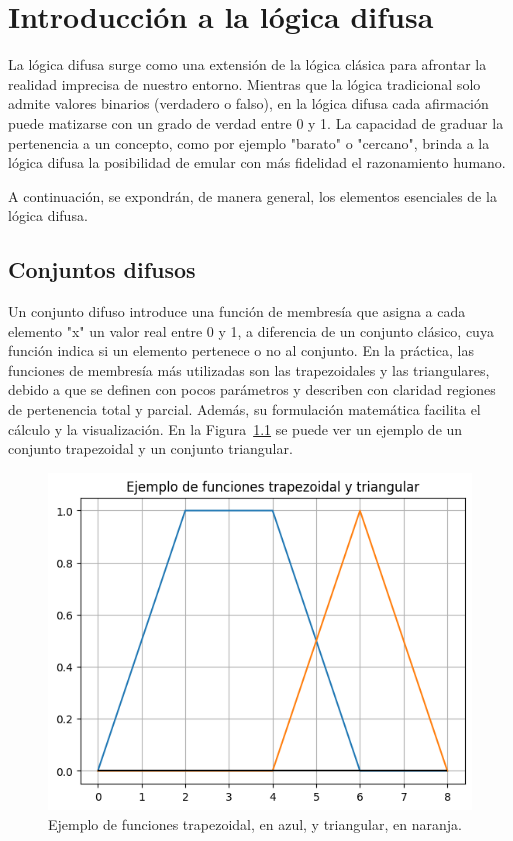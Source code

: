 \chapter{Introducción a la lógica difusa}
\label{ch:fuzzyApendix}

La lógica difusa surge como una extensión de la lógica clásica para afrontar la realidad imprecisa de nuestro entorno. Mientras que la lógica tradicional solo admite valores binarios (verdadero o falso), en la lógica difusa cada afirmación puede matizarse con un grado de verdad entre 0 y 1. La capacidad de graduar la pertenencia a un concepto, como por ejemplo "barato" o "cercano", brinda a la lógica difusa la posibilidad de emular con más fidelidad el razonamiento humano. 

A continuación, se expondrán, de manera general, los elementos esenciales de la lógica difusa.

\section{Conjuntos difusos}
\label{apx:ConjuntosDifusos}

Un conjunto difuso introduce una función de membresía que asigna a cada elemento "x" un valor real entre 0 y 1, a diferencia de un conjunto clásico, cuya función indica si un elemento pertenece o no al conjunto. En la práctica, las funciones de membresía más utilizadas son las trapezoidales y las triangulares, debido a que se definen con pocos parámetros y describen con claridad regiones de pertenencia total y parcial. Además, su formulación matemática facilita el cálculo y la visualización. En la Figura~\ref{fig:FuncionesTrapezoidalTriangular} se puede ver un ejemplo de un conjunto trapezoidal y un conjunto triangular. 

\begin{figure}[H]
\centering
\includegraphics[width=.65\textwidth]{fig/Fuzzy/Ejemplo de funcion trapezoidal y triangular.png}
\caption{Ejemplo de funciones trapezoidal, en azul, y triangular, en naranja.}
\label{fig:FuncionesTrapezoidalTriangular}
\end{figure}

